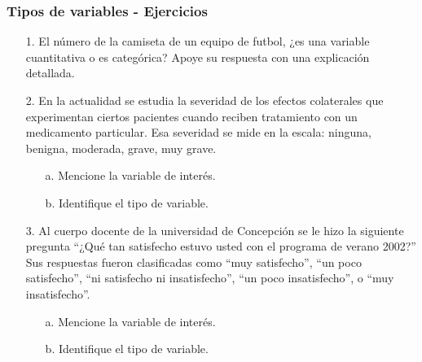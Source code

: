 \documentclass[10pt]{beamer}
\theoremstyle{plain} %
\theoremstyle{definition}
\theoremstyle{remark}
\begin{document}
\begin{frame}
\frametitle{Tipos de variables - Ejercicios}
\begin{itemize}
\justifying
\item[1.]El número de la camiseta de un equipo de futbol, ¿es una variable cuantitativa o es categórica? Apoye su respuesta con una explicación detallada.
\item[2.]En la actualidad se estudia la severidad de los efectos colaterales que experimentan ciertos pacientes cuando reciben tratamiento con un medicamento particular.
Esa severidad se mide en la escala: ninguna, benigna, moderada, grave, muy grave.\\

\begin{itemize}
\item[a.]Mencione la variable de interés.
\item[b.]Identifique el tipo de variable.

\end{itemize}
\item[3.]Al cuerpo docente de la universidad de Concepción se le hizo la siguiente pregunta ``¿Qué tan satisfecho estuvo usted con el programa de verano 2002?'' Sus respuestas fueron clasificadas como ``muy satisfecho'', ``un poco satisfecho'', ``ni satisfecho ni insatisfecho'', ``un poco insatisfecho'', o ``muy insatisfecho''.\\

\begin{itemize}
\item[a.]Mencione la variable de interés.
\item[b.]Identifique el tipo de variable.

\end{itemize}
\end{itemize} 
\end{frame}
\end{document}
